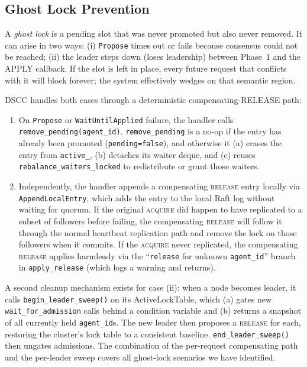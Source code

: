\documentclass[sigconf]{acmart}
\begin{document}
\subsection{Ghost Lock Prevention}
\label{sec:ghost}

A \emph{ghost lock} is a pending slot that was never promoted but also
never removed. It can arise in two ways: (i) \texttt{Propose} times out or
fails because consensus could not be reached; (ii) the leader steps down
(loses leadership) between Phase~1 and the APPLY callback. If the slot is
left in place, every future request that conflicts with it will block
forever; the system effectively wedges on that semantic region.

DSCC handles both cases through a deterministic compensating-RELEASE path:

\begin{enumerate}
\item On \texttt{Propose} or \texttt{WaitUntilApplied} failure, the handler
  calls \texttt{remove\_pending(agent\_id)}. \texttt{remove\_pending} is a
  no-op if the entry has already been promoted (\texttt{pending=false}),
  and otherwise it (a) erases the entry from \texttt{active\_}, (b) detaches
  its waiter deque, and (c) reuses \texttt{rebalance\_waiters\_locked} to
  redistribute or grant those waiters.
\item Independently, the handler appends a compensating \textsc{release}
  entry locally via \texttt{AppendLocalEntry}, which adds the entry to the
  local Raft log without waiting for quorum. If the original
  \textsc{acquire} did happen to have replicated to a subset of followers
  before failing, the compensating \textsc{release} will follow it through
  the normal heartbeat replication path and remove the lock on those
  followers when it commits. If the \textsc{acquire} never replicated, the
  compensating \textsc{release} applies harmlessly via the
  ``\texttt{release} for unknown \texttt{agent\_id}'' branch in
  \texttt{apply\_release} (which logs a warning and returns).
\end{enumerate}

A second cleanup mechanism exists for case (ii): when a node becomes
leader, it calls \texttt{begin\_leader\_sweep()} on its
ActiveLockTable, which (a) gates new \texttt{wait\_for\_admission} calls
behind a condition variable and (b) returns a snapshot of all currently
held \texttt{agent\_id}s. The new leader then proposes a \textsc{release}
for each, restoring the cluster's lock table to a consistent baseline.
\texttt{end\_leader\_sweep()} then ungates admissions. The combination of
the per-request compensating path and the per-leader sweep covers all
ghost-lock scenarios we have identified.
\end{document}
